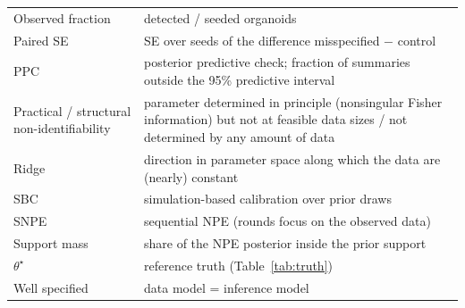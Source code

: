 \documentclass[10pt,a4paper]{article}
\begin{document}
\begin{center}
\begin{tabularx}{\linewidth}{@{}p{3.3cm}X@{}}
Observed fraction & detected / seeded organoids \\
Paired SE & SE over seeds of the difference misspecified $-$ control \\
PPC & posterior predictive check; fraction of summaries outside the 95\% predictive interval \\
Practical / structural non-identifiability & parameter determined in principle (nonsingular Fisher information) but not at feasible data sizes / not determined by any amount of data \\
Ridge & direction in parameter space along which the data are (nearly) constant \\
SBC & simulation-based calibration over prior draws \\
SNPE & sequential NPE (rounds focus on the observed data) \\
Support mass & share of the NPE posterior inside the prior support \\
$\theta^\star$ & reference truth (Table~\ref{tab:truth}) \\
Well specified & data model = inference model \\\bottomrule
\end{tabularx}
\end{center}
\end{document}

